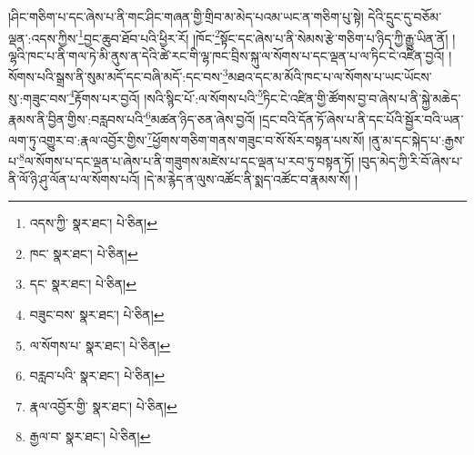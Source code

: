 །ཤིང་གཅིག་པ་དང་ཞེས་པ་ནི་གང་ཤིང་གཞན་གྱི་གྲིབ་མ་མེད་པའམ་ཡང་ན་གཅིག་པུ་སྟེ། དེའི་དྲུང་དུ་བཅོམ་ལྡན་:འདས་ཀྱིས་\footnote{འདས་ཀྱི་  སྣར་ཐང་།  པེ་ཅིན། }བྱང་ཆུབ་ཐོབ་པའི་ཕྱིར་རོ། །ཁོང་\footnote{ཁང་  སྣར་ཐང་།  པེ་ཅིན། }སྟོང་དང་ཞེས་པ་ནི་སེམས་རྩེ་གཅིག་པ་ཉིད་ཀྱི་རྒྱུ་ཡིན་ནོ། །ལྷའི་ཁང་པ་ནི་གལ་ཏེ་མི་ནུས་ན་དེའི་ཚེ་རང་གི་ལྷ་ཁང་བྲིས་སྐུ་ལ་སོགས་པ་དང་ལྡན་པ་ལ་ཏིང་ངེ་འཛིན་བྱའོ། །སོགས་པའི་སྒྲས་ནི་སུམ་མདོ་དང་བཞི་མདོ་:དང་བས་\footnote{དང་  སྣར་ཐང་།  པེ་ཅིན། }མཐའ་དང་མ་མོའི་ཁང་པ་ལ་སོགས་པ་ཡང་ཡོངས་སུ་:གཟུང་བས་\footnote{བཟུང་བས་  སྣར་ཐང་།  པེ་ཅིན། }རྟོགས་པར་བྱའོ། །སའི་སྙིང་པོ་:ལ་སོགས་པའི་\footnote{ལ་སོགས་པ་  སྣར་ཐང་།  པེ་ཅིན། }ཏིང་ངེ་འཛིན་གྱི་ཚོགས་བྱ་བ་ཞེས་པ་ནི་སྐྱེ་མཆེད་རྣམས་ནི་བྱིན་གྱིས་:བརླབས་པའི་\footnote{བརླབ་པའི་  སྣར་ཐང་།  པེ་ཅིན། }མཚན་ཉིད་ཅན་ཞེས་བྱའོ། །དྲང་བའི་དོན་ཏོ་ཞེས་པ་ནི་དང་པོའི་སྦྱོར་བའི་ཡན་ལག་ཏུ་འགྱུར་བ་:རྣལ་འབྱོར་གྱིས་\footnote{རྣལ་འབྱོར་གྱི་  སྣར་ཐང་།  པེ་ཅིན། }ཕྱོགས་གཅིག་གནས་གཟུང་བ་སོ་སོར་བསྟན་པས་སོ། །ནུ་མ་དང་སྐེད་པ་:རྒྱས་པ་\footnote{རྒྱལ་བ་  སྣར་ཐང་།  པེ་ཅིན། }ལ་སོགས་པ་དང་ལྡན་པ་ཞེས་པ་ནི་གཟུགས་མཛེས་པ་དང་ལྡན་པ་རབ་ཏུ་བསྟན་ཏོ། །བུད་མེད་ཀྱི་རི་བོ་ཞེས་པ་ནི་ལོ་ཉི་ཤུ་ལོན་པ་ལ་སོགས་པའོ། །དེ་མ་རྙེད་ན་ལུས་འཚོང་ནི་སྨད་འཚོང་བ་རྣམས་སོ། །
